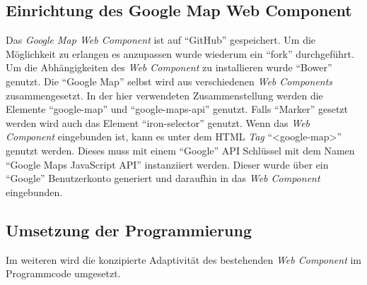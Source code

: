 \documentclass[12pt, paper=a4, bibtotoc, toc=listof, headsepline=true]{scrreprt}
\begin{document}
	\subsection{Einrichtung des Google Map Web Component}
	Das \emph{Google Map Web Component} ist auf \enquote{GitHub} gespeichert. Um die Möglichkeit zu erlangen es anzupassen wurde wiederum ein \enquote{fork} durchgeführt. Um die Abhängigkeiten des \emph{Web Component} zu installieren wurde \enquote{Bower} genutzt. Die \enquote{Google Map} selbst wird aus verschiedenen \emph{Web Components} zusammengesetzt. In der hier verwendeten Zusammenstellung werden die Elemente \enquote{google-map} und \enquote{google-maps-api} genutzt. Falls \enquote{Marker} gesetzt werden wird  auch das Element \enquote{iron-selector} genutzt. Wenn das \emph{Web Component} eingebunden ist, kann es unter dem \ac{HTML} \emph{Tag}  \enquote{<google-map>} genutzt werden. Dieses muss mit einem \enquote{Google} \ac{API} Schlüssel mit dem Namen \enquote{Google Maps JavaScript API} instanziiert werden. Dieser wurde über ein \enquote{Google} Benutzerkonto generiert und daraufhin in das \emph{Web Component} eingebunden. 
	\subsection{Umsetzung der Programmierung}
	Im weiteren wird die konzipierte Adaptivität des bestehenden \emph{Web Component} im Programmcode umgesetzt.
\end{document}
